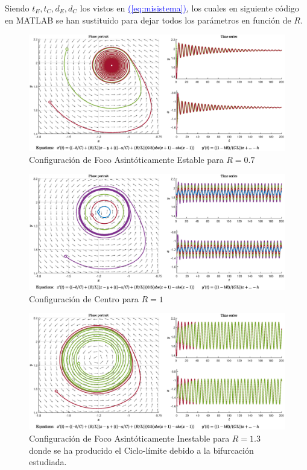 \documentclass[12pt,a4paper]{report} %
\newcommand{\eref}[1]{\hyperref[#1]{\textcolor{blue}{(\ref*{#1})}}}
\newcommand{\eref}[1]{\hyperref[#1]{\textcolor{blue}{\textit{(\ref*{#1})}}}}
\begin{document}
	\vspace{0.5cm}Siendo $t_E,t_C,d_E,d_C$ los vistos en \eref{eq:misistema}, los cuales en siguiente código en MATLAB se han sustituido para dejar todos los parámetros en función de $R$.
	
	\begin{figure}[h]
		\centering
		\includegraphics[width=1\textwidth]{r0.7.eps}
		\caption{Configuración de Foco Asintóticamente Estable para $R=0.7$}
		\label{fig:r0.7}
	\end{figure}
	\begin{figure}[h]
		\centering
		\includegraphics[width=1\textwidth]{r1.eps}
		\caption{Configuración de Centro para $R=1$}
		\label{fig:r1}
	\end{figure}
	
	\newpage
	
	\begin{figure}[h]
		\centering
		\includegraphics[width=1\textwidth]{r1.3.eps}
		\caption{Configuración de Foco Asintóticamente Inestable para $R=1.3$ donde se ha producido el Ciclo-límite debido a la bifurcación estudiada.}
		\label{fig:r1.3}
	\end{figure}\smallskip
	
\end{document}
